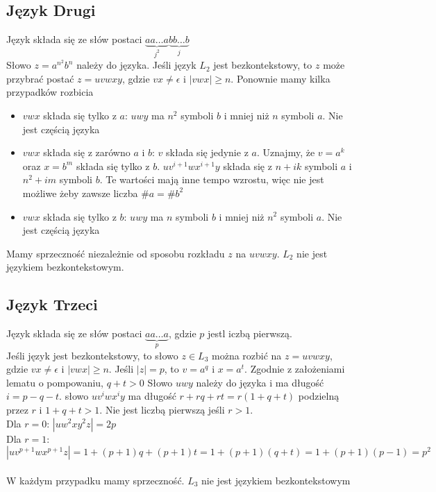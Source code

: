 \documentclass{article}
\begin{document}
\subsection{Język Drugi}
Język składa się ze słów postaci $\underbrace{aa\hdots a}_{j^2}\underbrace{bb\hdots b}_{j}$ \\
Słowo $z = a^{n^2}b^{n}$ należy do języka. Jeśli język $L_2$ jest bezkontekstowy, to $z$ może przybrać postać $z = uvwxy$, gdzie $vx \neq \epsilon$ i $|vwx| \geq n$. Ponownie mamy kilka przypadków rozbicia
\begin{itemize}
  \item $vwx$ składa się tylko z $a$: $uwy$ ma $n^2$ symboli $b$ i mniej niż $n$ symboli $a$. Nie jest częścią języka
  \item $vwx$ składa się z zarówno $a$ i $b$: $v$ składa się jedynie z $a$. Uznajmy, że $v = a^k$ oraz $x = b^m$ składa się tylko z $b$. $uv^{i+1}wx^{i+1}y$ składa się z $n + ik$ symboli $a$ i $n^2 + im$ symboli $b$. Te wartości mają inne tempo wzrostu, więc nie jest możliwe żeby zawsze liczba $\#a = \#b^2$
  \item $vwx$ składa się tylko z $b$: $uwy$ ma $n$ symboli $b$ i mniej niż $n^2$ symboli $a$. Nie jest częścią języka
\end{itemize}
Mamy sprzeczność niezależnie od sposobu rozkładu $z$ na $uvwxy$. $L_2$ nie jest językiem bezkontekstowym.

\subsection{Język Trzeci}
Język składa się ze słów postaci $\underbrace{aa\hdots a}_{p}$, gdzie $p$ jestl iczbą pierwszą. \\
Jeśli język jest bezkontekstowy, to słowo $z \in L_3$ można rozbić na $z = uvwxy$, gdzie $vx \neq \epsilon$ i $|vwx| \geq n$.
Jeśli $|z| = p$, to $v = a^q$ i $x = a^t$. Zgodnie z założeniami lematu o pompowaniu, $q + t > 0$ Słowo $uwy$ należy do języka i ma długość $i = p - q - t$.
słowo $uv^iwx^iy$ ma długość $r+rq+rt=r(1+q+t)$ podzielną przez $r$ i $1+q+t>1$. Nie jest liczbą pierwszą jeśli $r>1$.\\
Dla $r=0$: $|uw^2xy^2z|=2p$\\
Dla $r=1$: $|uv^{p+1}wx^{p+1}z|=1+(p+1)q+(p+1)t=1+(p+1)(q+t)=1+(p+1)(p-1)=p^2$\\ \\
W każdym przypadku mamy sprzeczność. $L_3$ nie jest językiem bezkontekstowym
\end{document}
